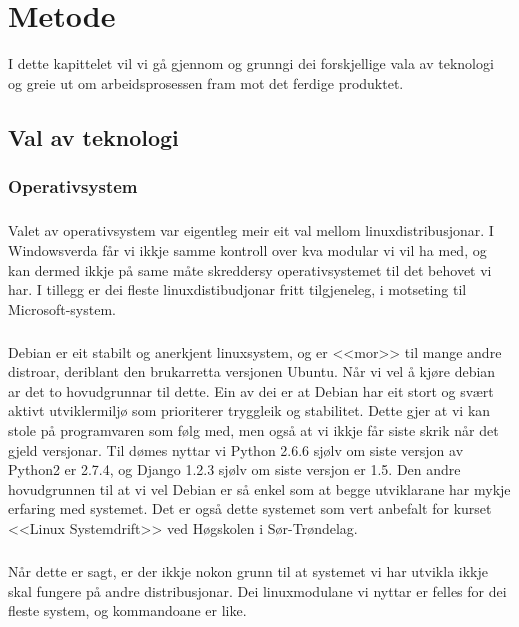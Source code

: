 \documentclass[nynorsk,12pt,a4paper,oneside]{book}
\begin{document}
\chapter{Metode}
I dette kapittelet vil vi gå gjennom og grunngi dei forskjellige vala av teknologi og greie ut om arbeidsprosessen fram mot det ferdige produktet. 
 
\section{Val av teknologi}
\subsection{Operativsystem}
\paragraph{}
Valet av operativsystem var eigentleg meir eit val mellom linuxdistribusjonar. I Windowsverda får vi ikkje samme kontroll over kva modular vi vil ha med, og kan dermed ikkje på same måte skreddersy operativsystemet til det behovet vi har. I tillegg er dei fleste linuxdistibudjonar fritt tilgjeneleg, i motseting til Microsoft-system. 
\paragraph{}
Debian er eit stabilt og anerkjent linuxsystem, og er <<mor>> til mange andre distroar, deriblant den brukarretta versjonen Ubuntu. Når vi vel å kjøre debian ar det to hovudgrunnar til dette. Ein av dei er at Debian har eit stort og svært aktivt utviklermiljø som prioriterer tryggleik og stabilitet. Dette gjer at vi kan stole på programvaren som følg med, men også at vi ikkje får siste skrik når det gjeld versjonar. Til dømes nyttar vi Python 2.6.6 sjølv om siste versjon av Python2 er 2.7.4, og Django 1.2.3 sjølv om siste versjon er 1.5. 
Den andre hovudgrunnen til at vi vel Debian er så enkel som at begge utviklarane har mykje erfaring med systemet. Det er også dette systemet som vert anbefalt for kurset <<Linux Systemdrift>> ved Høgskolen i Sør-Trøndelag.
\paragraph{}
Når dette er sagt, er der ikkje nokon grunn til at systemet vi har utvikla ikkje skal fungere på andre distribusjonar. Dei linuxmodulane vi nyttar er felles for dei fleste system, og kommandoane er like.  
\end{document}
